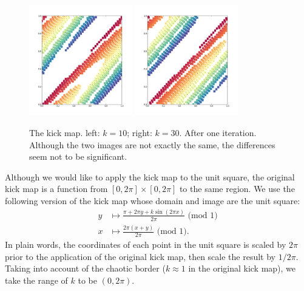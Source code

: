 \documentclass[12pt]{reedmcm}
\begin{document}
\begin{figure}[t]
  \centering
  \includegraphics[width=0.4\textwidth]{kickmap_2pi}
  \hspace{2cm}
  \includegraphics[width=0.4\textwidth]{kickmap_3pi}
  \caption{The kick map. left: $k=10$; right: $k = 30$. After one iteration. 
    Although the two images are not exactly the same, the differences seem not to be significant.
  }
  \label{fig:kickmap_demo2}
\end{figure}

Although we would like to apply the kick map to the unit square, the original kick map is a function from $[0,2\pi] \times [0,2\pi]$ to the same region.
We use the following version of the kick map whose domain and image are the unit square:
\begin{align*}
  y &\mapsto \frac{\pi + 2\pi y + k \sin (2\pi x)}{2\pi} \mbox{ (mod 1)}\\
  x &\mapsto \frac{2\pi (x + y)}{2\pi} \mbox{ (mod 1)}.
\end{align*}
In plain words, the coordinates of each point in the unit square is scaled by $2\pi$ prior to the application of the original kick map, then scale the result by $1/2\pi$.
Taking into account of the chaotic border ($k\approx 1$ in the original kick map), we take the range of $k$ to be $(0,2\pi)$.
\end{document}
